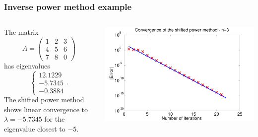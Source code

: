 \documentclass{beamer}
\begin{document}
\begin{frame}
  \frametitle{Inverse power method example}


  \begin{columns}
    \begin{column}{0.35\textwidth}
      The matrix
      \begin{equation*}
        A =
        \begin{pmatrix}
          1 & 2 & 3 \\
          4 & 5 & 6 \\
          7 & 8 & 0
        \end{pmatrix}
      \end{equation*}
      has eigenvalues
      \begin{equation*}
        \left\{
          \begin{array}{c}
            12.1229\\ -5.7345\\ -0.3884
          \end{array}\right. .
      \end{equation*}
      The shifted power method shows linear convergence to $\lambda =
      -5.7345$ for the eigenvalue closest to $-5$.
    \end{column}
    \begin{column}{0.65\textwidth}
      \includegraphics[width=\textwidth]{figures/ShiftedPowerFull1}
    \end{column}
  \end{columns}

\end{frame}

\end{document}
